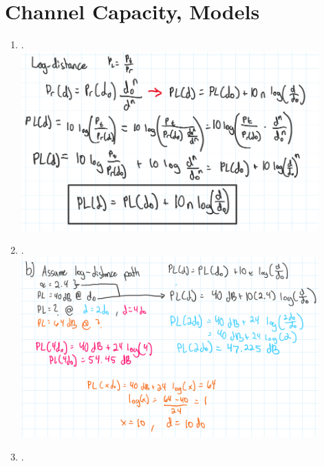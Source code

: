\documentclass[11pt]{article}
\begin{document}
\section{Channel Capacity, Models}
\begin{enumerate}[label=(\alph*)]
\item .\\
    \includegraphics[width=0.9\textwidth]{2a}\\
\item  .\\
    \includegraphics[width=0.9\textwidth]{2b}\\
\item  .\\

\end{enumerate}
\end{document}
